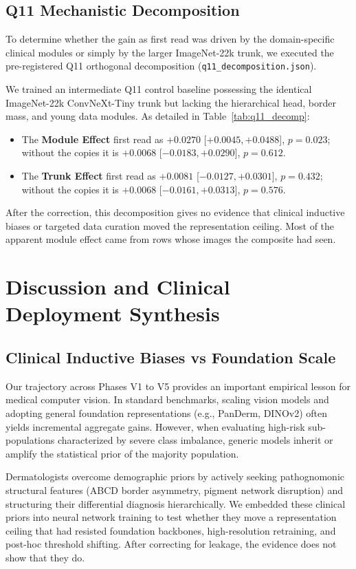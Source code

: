\documentclass[journal]{IEEEtran}
\begin{document}
\subsection{Q11 Mechanistic Decomposition}\label{sec:decomposition}
To determine whether the gain as first read was driven by the domain-specific clinical modules or simply by the larger ImageNet-22k trunk, we executed the pre-registered Q11 orthogonal decomposition (\texttt{q11\_decomposition.json}). 

We trained an intermediate Q11 control baseline possessing the identical ImageNet-22k ConvNeXt-Tiny trunk but lacking the hierarchical head, border mass, and young data modules. As detailed in Table~\ref{tab:q11_decomp}:
\begin{itemize}
\item The \textbf{Module Effect} first read as $+0.0270$ [$+0.0045, +0.0488$], $p = 0.023$; without the copies it is $+0.0068$ [$-0.0183, +0.0290$], $p = 0.612$.
\item The \textbf{Trunk Effect} first read as $+0.0081$ [$-0.0127, +0.0301$], $p = 0.432$; without the copies it is $+0.0068$ [$-0.0161, +0.0313$], $p = 0.576$.
\end{itemize}
After the correction, this decomposition gives no evidence that clinical inductive biases or targeted data curation moved the representation ceiling. Most of the apparent module effect came from rows whose images the composite had seen.

\section{Discussion and Clinical Deployment Synthesis}

\subsection{Clinical Inductive Biases vs Foundation Scale}
Our trajectory across Phases V1 to V5 provides an important empirical lesson for medical computer vision. In standard benchmarks, scaling vision models and adopting general foundation representations (e.g., PanDerm, DINOv2) often yields incremental aggregate gains. However, when evaluating high-risk sub-populations characterized by severe class imbalance, generic models inherit or amplify the statistical prior of the majority population. 

Dermatologists overcome demographic priors by actively seeking pathognomonic structural features (ABCD border asymmetry, pigment network disruption) and structuring their differential diagnosis hierarchically. We embedded these clinical priors into neural network training to test whether they move a representation ceiling that had resisted foundation backbones, high-resolution retraining, and post-hoc threshold shifting. After correcting for leakage, the evidence does not show that they do.
\end{document}
